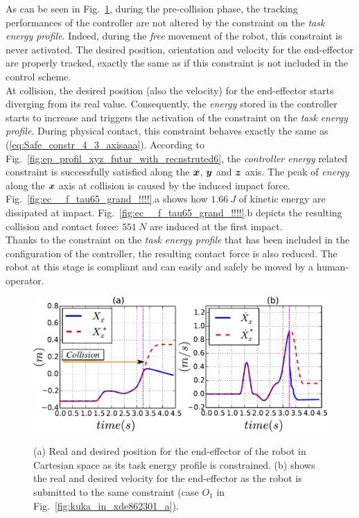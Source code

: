 \documentclass[letterpaper, 10 pt, conference]{ieeeconf}      %
\newcommand{\vect}[1]{\mbox{\boldmath${#1}$}}%
\begin{document}
As can be seen in Fig.~\ref{fig:x_x_dot454}, during the pre-collision phase, the tracking performances of the controller are not altered by the constraint on the \textit{task energy profile}. Indeed, during the \textit{free} movement of the robot, this constraint is never activated. The desired position, orientation and velocity for the end-effector are properly tracked, exactly the same as if this constraint is not included in the control scheme. \\
At collision, the desired position (also the velocity) for the end-effector starts diverging from its real value. Consequently, the \textit{energy} stored in the controller starts to increase and triggers the activation of the constraint on the \textit{task energy profile}. During physical contact, this constraint behaves exactly the same as (\ref{eq:Safe_constr_4_3_axisaaa}). According to Fig.~\ref{fig:ep_profil_xyz_futur_with_recnstruted6}, the \textit{controller energy} related constraint is successfully satisfied along the $\vect{x}$, $\vect{y}$ and $\vect{z}$ axis.
The peak of \textit{energy} along the $\vect{x}$ axis at collision is caused by the induced impact force. \\
Fig.~\ref{fig:ec__f_tau65_grand_!!!!}.a shows how $1.66~J$ of kinetic energy are dissipated at impact. Fig.~\ref{fig:ec__f_tau65_grand_!!!!}.b depicts the resulting collision  and contact force: $551~N$ are induced at the first impact. \\ 
Thanks to the constraint on the \textit{task energy profile} that has been included in the configuration of the controller, the resulting contact force is also reduced. The robot at this stage is compliant and can easily and safely be moved by a human-operator. 
\begin{figure}[!htbp]
\centering
{\includegraphics[width=0.99\columnwidth]{figures/x_x_dot454}}
\caption{(a) Real and desired position for the end-effector of the robot in Cartesian space as its task energy profile is constrained. (b) shows the real and desired velocity for the end-effector as the robot is submitted to the same constraint (case $O_1$ in Fig.~\ref{fig:kuka_in_xde862301_a}).} 
\label{fig:x_x_dot454}
\end{figure}
\end{document}
